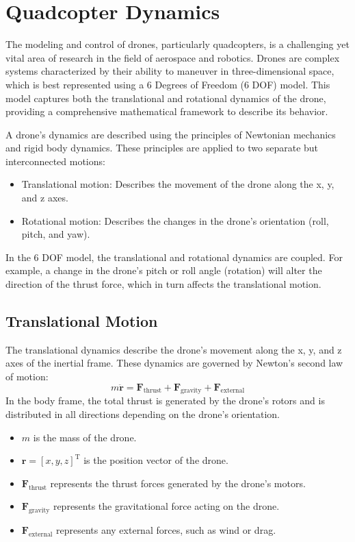 \documentclass[a4paper,12pt]{report}
\begin{document}
\chapter{Quadcopter Dynamics}
The modeling and control of drones, particularly quadcopters, is a challenging yet vital area of research in the field of aerospace and robotics. 
Drones are complex systems characterized by their ability to maneuver in three-dimensional space, which is best represented using a 6 Degrees of Freedom (6 DOF) model. 
This model captures both the translational and rotational dynamics of the drone, providing a comprehensive mathematical framework to describe its behavior.

A drone's dynamics are described using the principles of Newtonian mechanics and rigid body dynamics. These principles are applied to two separate but interconnected motions:
\begin{itemize}
    \item Translational motion: Describes the movement of the drone along the x, y, and z axes.
    \item Rotational motion: Describes the changes in the drone’s orientation (roll, pitch, and yaw).
\end{itemize}

In the 6 DOF model, the translational and rotational dynamics are coupled. For example, a change in the drone’s pitch or roll angle (rotation) will alter the direction of the thrust force, which in turn affects the translational motion.

\section{Translational Motion}
The translational dynamics describe the drone’s movement along the x, y, and z axes of the inertial frame. These dynamics are governed by Newton’s second law of motion:
\[
m \ddot{\mathbf{r}} = \mathbf{F}_{\text{thrust}} + \mathbf{F}_{\text{gravity}} + \mathbf{F}_{\text{external}}
\]
In the body frame, the total thrust is generated by the drone's rotors and is distributed in all directions depending on the drone’s orientation.
\begin{itemize}
    \item \(m\) is the mass of the drone.
    \item \(\mathbf{r} = [x, y, z]^\text{T}\) is the position vector of the drone.
    \item \(\mathbf{F}_{\text{thrust}}\) represents the thrust forces generated by the drone's motors.
    \item \(\mathbf{F}_{\text{gravity}}\) represents the gravitational force acting on the drone.
    \item \(\mathbf{F}_{\text{external}}\) represents any external forces, such as wind or drag.
\end{itemize}
\end{document}
